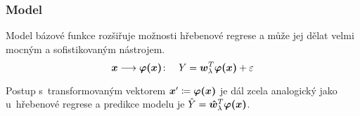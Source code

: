 \subsubsection{Model}
Model bázové funkce rozšiřuje možnosti hřebenové regrese a může jej dělat velmi mocným a sofistikovaným nástrojem.
\[\bm{x} \longrightarrow \bm{\varphi(\bm{x})} \colon \quad Y = \bm{w}_\lambda^T\bm{\varphi(\bm{x})} + \varepsilon\]

Postup s~transformovaným vektorem $\bm{x}' \coloneqq \bm{\varphi(\bm{x})}$ je dál zcela analogický jako u~hřebenové regrese a predikce modelu je $\hat{Y} = \bm{\hat{w}}_\lambda^T\bm{\varphi(\bm{x})}$.
